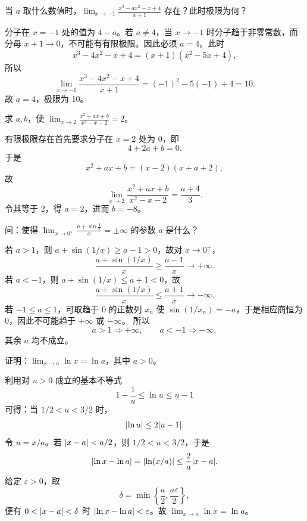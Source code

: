 \begin{xexercise}[4]
当 $a$ 取什么数值时，$\displaystyle\lim_{x\to-1}\frac{x^3-ax^2-x+4}{x+1}$ 存在？此时极限为何？
\end{xexercise}
\begin{xsolution}
分子在 $x=-1$ 处的值为 $4-a$。若 $a\ne4$，当 $x\to-1$ 时分子趋于非零常数，而分母 $x+1\to0$，不可能有有限极限。因此必须 $a=4$。此时
\[
  x^3-4x^2-x+4=(x+1)(x^2-5x+4),
\]
所以
\[
  \lim_{x\to-1}\frac{x^3-4x^2-x+4}{x+1}
  =(-1)^2-5(-1)+4=10.
\]
故 $a=4$，极限为 10。
\end{xsolution}


\begin{xexercise}[5]
求 $a,b$，使 $\displaystyle\lim_{x\to2}\frac{x^2+ax+b}{x^2-x-2}=2$。
\end{xexercise}
\begin{xsolution}
有限极限存在首先要求分子在 $x=2$ 处为 0，即
\[
  4+2a+b=0.
\]
于是
\[
  x^2+ax+b=(x-2)(x+a+2),
\]
故
\[
  \lim_{x\to2}\frac{x^2+ax+b}{x^2-x-2}
  =\frac{a+4}{3}.
\]
令其等于 2，得 $a=2$，进而 $b=-8$。
\end{xsolution}


\begin{xexercise}[6]
问：使得 $\displaystyle\lim_{x\to0^+}\frac{a+\sin\frac1x}{x}=\pm\infty$ 的参数 $a$ 是什么？
\end{xexercise}
\begin{xsolution}
若 $a>1$，则 $a+\sin(1/x)\geq a-1>0$，故对 $x\to0^+$，
\[
  \frac{a+\sin(1/x)}x\geq\frac{a-1}{x}\to+\infty.
\]
若 $a<-1$，则 $a+\sin(1/x)\leq a+1<0$，故
\[
  \frac{a+\sin(1/x)}x\leq\frac{a+1}{x}\to-\infty.
\]
若 $-1\leq a\leq1$，可取趋于 0 的正数列 $x_n$ 使
$\sin(1/x_n)=-a$，于是相应商恒为 0，因此不可能趋于 $+\infty$ 或 $-\infty$。
所以
\[
  a>1\Rightarrow+\infty,\qquad a<-1\Rightarrow-\infty,
\]
其余 $a$ 均不成立。
\end{xsolution}


\begin{xexercise}[7]
证明：$\displaystyle\lim_{x\to a}\ln x=\ln a$，其中 $a>0$。
\end{xexercise}
\begin{xsolution}
利用对 $u>0$ 成立的基本不等式
\[
  1-\frac1u\leq\ln u\leq u-1
\]
可得：当 $1/2<u<3/2$ 时，
\[
  \lvert\ln u\rvert\leq2\lvert u-1\rvert.
\]
令 $u=x/a$。若 $\lvert x-a\rvert<a/2$，则 $1/2<u<3/2$，于是
\[
  \lvert\ln x-\ln a\rvert
  =\lvert\ln(x/a)\rvert
  \leq\frac2a\lvert x-a\rvert.
\]
给定 $\varepsilon>0$，取
\[
  \delta=\min\left\{\frac a2,\frac{a\varepsilon}2\right\},
\]
便有 $0<\lvert x-a\rvert<\delta$ 时 $\lvert\ln x-\ln a\rvert<\varepsilon$。故
$\lim_{x\to a}\ln x=\ln a$。
\end{xsolution}


